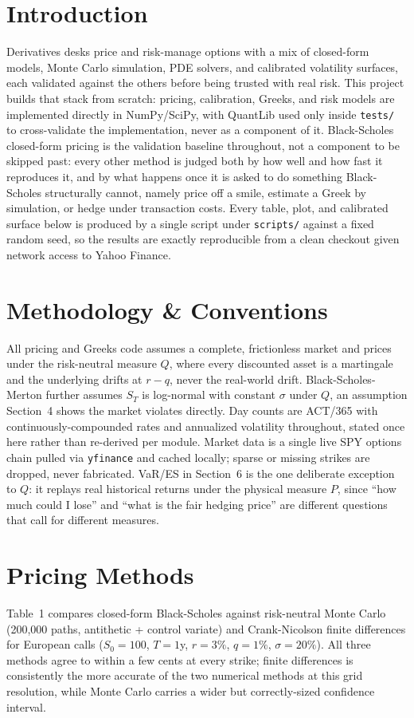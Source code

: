 \documentclass[10pt]{article}
\newcommand{\code}[1]{\texttt{\small #1}}
\begin{document}
\section{Introduction}
Derivatives desks price and risk-manage options with a mix of closed-form models, Monte Carlo simulation, PDE solvers, and calibrated volatility surfaces, each validated against the others before being trusted with real risk. This project builds that stack from scratch: pricing, calibration, Greeks, and risk models are implemented directly in NumPy/SciPy, with QuantLib used only inside \code{tests/} to cross-validate the implementation, never as a component of it. Black-Scholes closed-form pricing is the validation baseline throughout, not a component to be skipped past: every other method is judged both by how well and how fast it reproduces it, and by what happens once it is asked to do something Black-Scholes structurally cannot, namely price off a smile, estimate a Greek by simulation, or hedge under transaction costs. Every table, plot, and calibrated surface below is produced by a single script under \code{scripts/} against a fixed random seed, so the results are exactly reproducible from a clean checkout given network access to Yahoo Finance.

\section{Methodology \& Conventions}
All pricing and Greeks code assumes a complete, frictionless market and prices under the risk-neutral measure $Q$, where every discounted asset is a martingale and the underlying drifts at $r-q$, never the real-world drift. Black-Scholes-Merton further assumes $S_T$ is log-normal with constant $\sigma$ under $Q$, an assumption Section~4 shows the market violates directly. Day counts are ACT/365 with continuously-compounded rates and annualized volatility throughout, stated once here rather than re-derived per module. Market data is a single live SPY options chain pulled via \code{yfinance} and cached locally; sparse or missing strikes are dropped, never fabricated. VaR/ES in Section~6 is the one deliberate exception to $Q$: it replays real historical returns under the physical measure $P$, since ``how much could I lose'' and ``what is the fair hedging price'' are different questions that call for different measures.

\section{Pricing Methods}
Table~1 compares closed-form Black-Scholes against risk-neutral Monte Carlo (200{,}000 paths, antithetic + control variate) and Crank-Nicolson finite differences for European calls ($S_0{=}100$, $T{=}1$y, $r{=}3\%$, $q{=}1\%$, $\sigma{=}20\%$). All three methods agree to within a few cents at every strike; finite differences is consistently the more accurate of the two numerical methods at this grid resolution, while Monte Carlo carries a wider but correctly-sized confidence interval.
\end{document}
